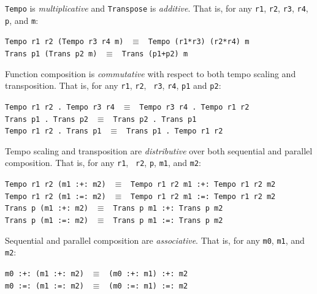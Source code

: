 \begin{axiom}
{\tt Tempo} is {\em multiplicative} and {\tt Transpose} is {\em
additive}.  That is, for any {\tt r1}, {\tt r2}, {\tt r3}, {\tt r4},
{\tt p}, and {\tt m}:
\begin{center}
{\tt Tempo r1 r2 (Tempo r3 r4 m)} $\ \ \equiv\ \ $ {\tt Tempo (r1*r3) (r2*r4) m}\\
{\tt Trans p1 (Trans p2 m)} $\ \ \equiv\ \ $ {\tt Trans (p1+p2) m}
\end{center}
\end{axiom}
\begin{axiom}
Function composition is {\em commutative} with respect to both tempo
scaling and transposition.  That is, for any {\tt r1}, {\tt r2}, {\tt
r3}, {\tt r4}, {\tt p1} and {\tt p2}:
\begin{center}
{\tt Tempo r1 r2 .\ Tempo r3 r4} $\ \ \equiv\ \ $ {\tt Tempo r3 r4 .\ Tempo r1 r2}\\
{\tt Trans p1 .\ Trans p2} $\ \ \equiv\ \ $ {\tt Trans p2 .\ Trans p1}\\
{\tt Tempo r1 r2 .\ Trans p1} $\ \ \equiv\ \ $ {\tt Trans p1 .\ Tempo r1 r2}\\
\end{center}
\end{axiom}
\begin{axiom}
Tempo scaling and transposition are {\em distributive} over both
sequential and parallel composition.  That is, for any {\tt r1}, {\tt
r2}, {\tt p}, {\tt m1}, and {\tt m2}:
\begin{center}
{\tt Tempo r1 r2 (m1 :+:\ m2)} $\ \ \equiv\ \ $ {\tt Tempo r1 r2 m1 :+:\ Tempo r1 r2 m2}\\
{\tt Tempo r1 r2 (m1 :=:\ m2)} $\ \ \equiv\ \ $ {\tt Tempo r1 r2 m1 :=:\ Tempo r1 r2 m2}\\
{\tt Trans p (m1 :+:\ m2)} $\ \ \equiv\ \ $ {\tt Trans p m1 :+:\ Trans p m2}\\
{\tt Trans p (m1 :=:\ m2)} $\ \ \equiv\ \ $ {\tt Trans p m1 :=:\ Trans p m2}
\end{center}
\end{axiom}
\begin{axiom}
Sequential and parallel composition are {\em associative}.  That is,
for any {\tt m0}, {\tt m1}, and {\tt m2}:
\begin{center}
{\tt m0 :+:\ (m1 :+:\ m2)} $\ \ \equiv\ \ $ {\tt (m0 :+:\ m1) :+:\ m2}\\
{\tt m0 :=:\ (m1 :=:\ m2)} $\ \ \equiv\ \ $ {\tt (m0 :=:\ m1) :=:\ m2}
\end{center}
\end{axiom}
